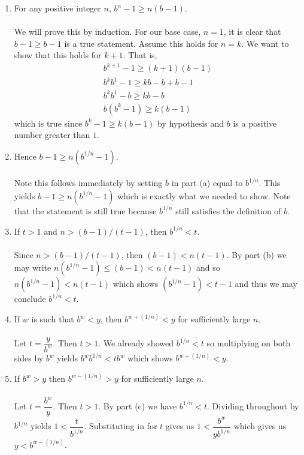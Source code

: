 \documentclass[12pt]{article}
\begin{document}
\begin{enumerate}


\item For any positive integer $n$, $b^{n}-1 \geq n(b-1)$. \\ \\
We will prove this by induction. For our base case, $n=1$, it is clear that $b-1 \geq b-1$ is a true statement. Assume this holds for $n=k$. We want to show that this holds for $k+1$. That is,
\begin{align*}
b^{k+1}-1 \geq (k+1)(b-1) \\
b^{k}b^{1}-1 \geq kb-b+b-1 \\
b^{k}b^{1}-b \geq kb-b \\
b(b^{k}-1) \geq k(b-1)
\end{align*}
which is true since $b^{k}-1 \geq k(b-1)$ by hypothesis and $b$ is a positive number greater than $1$. \\
\item Hence $b-1 \geq n(b^{1/n}-1)$. \\ \\
Note this follows immediately by setting $b$ in part (a) equal to $b^{1/n}$. This yields $b-1 \geq n(b^{1/n}-1)$ which is exactly what we needed to show. Note that the statement is still true because $b^{1/n}$ still satisfies the definition of $b$. \\ 


\item If $t>1$ and $n>(b-1)/(t-1)$, then $b^{1/n}<t$. \\ \\
Since $n>(b-1)/(t-1)$, then $(b-1)<n(t-1)$. By part (b) we may write $n(b^{1/n}-1) \leq (b-1)<n(t-1)$ and so $n(b^{1/n}-1) < n(t-1)$ which shows $(b^{1/n}-1) < t-1$ and thus we may conclude  $b^{1/n}<t$.

\item If $w$ is such that $b^{w} < y$, then $b^{w+(1/n)} < y$ for sufficiently large $n$. \\ \\
Let $t=\dfrac{y}{b^{w}}$. Then $t>1$. We already showed $b^{1/n}<t$ so multiplying on both sides by $b^{w}$ yields $b^{w}b^{1/n} < tb^{w}$ which shows $b^{w+(1/n)} < y$. \\ 

\item If $b^{w} > y$ then $b^{w-(1/n)}>y$ for sufficiently large $n$. \\ \\
Let $t=\dfrac{b^{w}}{y}$. Then $t>1$. By part (c) we have $b^{1/n}<t$. Dividing throughout by $b^{1/n}$ yields $1< \dfrac{t}{b^{1/n}}$. Substituting in for $t$ gives us $1< \dfrac{b^{w}}{yb^{1/n}}$ which gives us $y< b^{w-(1/n)}$. \\


\end{enumerate}
\end{document}
